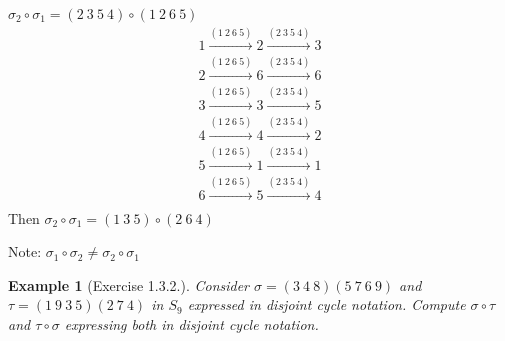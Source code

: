 \documentclass[11pt,a4paper]{article}
\newtheorem{example}{Example}
\begin{document}
$\sigma_2 \circ \sigma_1=(2\ 3\ 5\ 4)\circ (1\ 2\ 6\ 5)$
\begin{equation}
    \begin{aligned}
        1 \stackrel{(1\ 2\ 6\ 5)}{\longrightarrow} 2 \stackrel{(2\ 3\ 5\ 4)}{\longrightarrow} 3\\
        2 \stackrel{(1\ 2\ 6\ 5)}{\longrightarrow} 6 \stackrel{(2\ 3\ 5\ 4)}{\longrightarrow} 6\\
        3 \stackrel{(1\ 2\ 6\ 5)}{\longrightarrow} 3 \stackrel{(2\ 3\ 5\ 4)}{\longrightarrow} 5\\
        4 \stackrel{(1\ 2\ 6\ 5)}{\longrightarrow} 4 \stackrel{(2\ 3\ 5\ 4)}{\longrightarrow} 2\\
        5 \stackrel{(1\ 2\ 6\ 5)}{\longrightarrow} 1 \stackrel{(2\ 3\ 5\ 4)}{\longrightarrow} 1\\
        6 \stackrel{(1\ 2\ 6\ 5)}{\longrightarrow} 5 \stackrel{(2\ 3\ 5\ 4)}{\longrightarrow} 4\\
    \end{aligned}
    \nonumber
\end{equation}
Then $\sigma_2 \circ \sigma_1=(1\ 3\ 5)\circ (2\ 6\ 4)$

Note: $\sigma_1 \circ \sigma_2\neq\sigma_2 \circ \sigma_1$

\begin{example}[Exercise 1.3.2.]
    Consider $\sigma = (3\ 4\ 8)(5\ 7\ 6\ 9)$ and $\tau = (1\ 9\ 3\ 5)(2\ 7\ 4)$ in $S_9$ expressed in disjoint cycle
    notation. Compute $\sigma\circ\tau$ and $\tau\circ\sigma$ expressing both in disjoint cycle notation.
\end{example}
\end{document}
